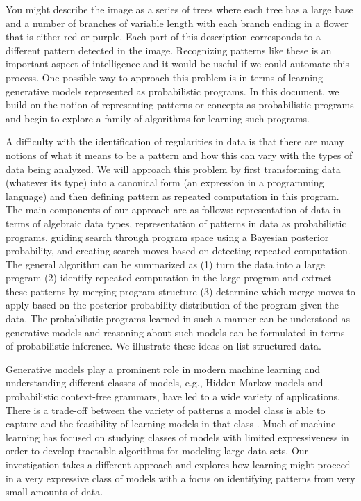\documentclass[a4paper,10pt]{article}
\begin{document}
You might describe the image as a series of trees where each tree has a large base and a number of branches of variable length with each branch ending in a flower that is either red or purple. Each part of this description corresponds to a different pattern detected in the image.  Recognizing patterns like these is an important aspect of intelligence and it would be useful if we could automate this process.  One possible way to approach this problem is in terms of learning generative models represented as probabilistic programs.  In this document, we build on the notion of representing patterns or concepts as probabilistic programs \cite{A.Stuhlmueller:2010:6d11a} and begin to explore a family of algorithms for learning such programs.

A difficulty with the identification of regularities in data is that there are many notions of what it means to be a pattern and how this can vary with the types of data being analyzed.  We will approach this problem by first transforming data (whatever its type) into a canonical form (an expression in a programming language) and then defining pattern as repeated computation in this program.  The main components of our approach are as follows: representation of data in terms of algebraic data types, representation of patterns in data as probabilistic programs, guiding search through program space using a Bayesian posterior probability, and creating search moves based on detecting repeated computation.  The general algorithm can be summarized as (1) turn the data into a large program (2) identify repeated computation in the large program and extract these patterns by merging program structure (3) determine which merge moves to apply based on the posterior probability distribution of the program given the data.  The probabilistic programs learned in such a manner can be understood as generative models and reasoning about such models can be formulated in terms of probabilistic inference. We illustrate these ideas on list-structured data.

Generative models play a prominent role in modern machine learning and understanding different classes of models, e.g., Hidden Markov models and probabilistic context-free grammars, have led to a wide variety of applications.  There is a trade-off between the variety of patterns a model class is able to capture and the feasibility of learning models in that class \cite{Russell2003}.  Much of machine learning has focused on studying classes of models with limited expressiveness in order to develop tractable algorithms for modeling large data sets.  Our investigation takes a different approach and explores how learning might proceed in a very expressive class of models with a focus on identifying patterns from very small amounts of data.
\end{document}
